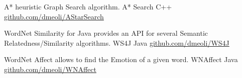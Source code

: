 \begin{cventries}
  \cventry
    {A* heuristic Graph Search algorithm.} %
    {A* Search} %
    {C++} %
    {\href{https://github.com/dmeoli/AStarSearch}{github.com/dmeoli/AStarSearch}} %
    {}

  \cventry
    {WordNet Similarity for Java provides an API for several Semantic Relatedness/Similarity algorithms.} %
    {WS4J} %
    {Java} %
    {\href{https://github.com/dmeoli/WS4J}{github.com/dmeoli/WS4J}} %
    {}

  \cventry
    {WordNet Affect allows to find the Emotion of a given word.} %
    {WNAffect} %
    {Java} %
    {\href{https://github.com/dmeoli/WNAffect}{github.com/dmeoli/WNAffect}} %
    {}

\end{cventries}
